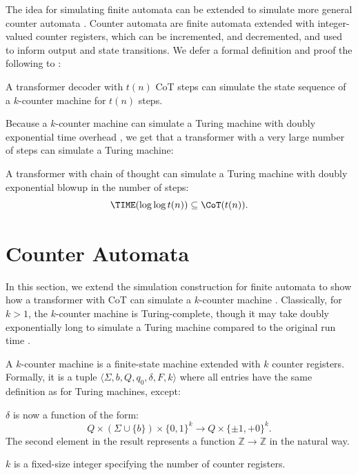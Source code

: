 The idea for simulating finite automata can be extended to simulate more general counter automata \citep{minsky1961recursive,fischer1966turing,merrill2021linguistic}. Counter automata are finite automata extended with integer-valued counter registers, which can be incremented, and decremented, and used to inform output and state transitions. We defer a formal definition and proof the following to :

\begin{theorem}
    A transformer decoder with $t(n)$ CoT steps can simulate the state sequence of a $k$-counter machine for $t(n)$ steps.
\end{theorem}

Because a $k$-counter machine can simulate a Turing machine with doubly exponential time overhead \citep[][Theorem 1]{minsky1961recursive}, we get that a transformer with a very large number of steps can simulate a Turing machine:

\begin{corollary} \label{thm:counter-automata}
    A transformer with chain of thought can simulate a Turing machine with doubly exponential blowup in the number of steps:
    \begin{equation*}
        \TIME(\log \log t(n)) \subseteq \CoT(t(n)) .
    \end{equation*}
\end{corollary}


\section{Counter Automata} \label{app:counter-automata}

In this section, we extend the simulation construction for finite automata to show how a transformer with CoT can simulate a $k$-counter machine \citep{fischer1966turing}. Classically, for $k > 1$, the $k$-counter machine is Turing-complete, though it may take doubly exponentially long to simulate a Turing machine compared to the original run time \citep[][Theorem 1]{minsky1961recursive}.

A $k$-counter machine is a finite-state machine extended with $k$ counter registers. Formally, it is a tuple $\langle \Sigma, b, Q, q_0, \delta, F, k \rangle$ where all entries have the same definition as for Turing machines, except:
\begin{compactenum}
    \item $\delta$ is now a function of the form:
    \begin{equation*}
        Q \times (\Sigma \cup \{b\}) \times \{0, 1\}^k \to Q \times \{{\pm}1, {+}0 \}^k .
    \end{equation*}
    The second element in the result represents a function $\mathbb Z \to \mathbb Z$ in the natural way. 
    \item $k$ is a fixed-size integer specifying the number of counter registers.
\end{compactenum}

